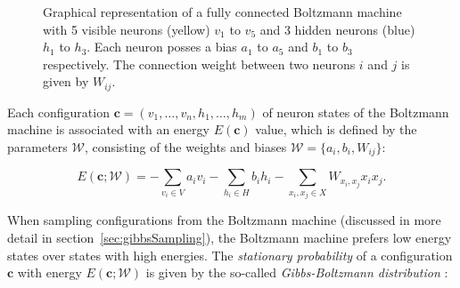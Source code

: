 \begin{figure}[H]
    \centering
    \caption[Fully Connected Boltzmann Machine]{Graphical representation of a fully connected Boltzmann machine with 5 visible neurons (yellow) $v_1$ to $v_5$
    and 3 hidden neurons (blue) $h_1$ to $h_3$. Each neuron posses a bias
    $a_1$ to $a_5$ and $b_1$ to $b_3$ respectively. The connection weight between two neurons $i$ and $j$
    is given by $W_{ij}$.}
    \label{fig:boltzmannMachine}
\end{figure}

Each configuration $\bm{c}=(v_1,\dots,v_n,h_1,\dots,h_m)$ of neuron states
of the Boltzmann machine is associated with an energy $E(\bm{c})$ value,
which is defined by the parameters $\mathcal{W}$, consisting of the weights and 
biases $\mathcal{W} = \{a_i, b_i, W_{ij}\}$:

\begin{equation}
  E(\bm{c};\mathcal{W}) = - \sum_{v_i \in V} a_{i}v_{i} - \sum_{h_i \in H} b_{i}h_{i} - \sum_{x_i,x_j \in X} W_{x_i,x_j}x_{i}x_{j}.
\end{equation}

When sampling configurations from the Boltzmann machine (discussed in more detail in section~\ref{sec:gibbsSampling}), the 
Boltzmann machine prefers low energy states over states with high energies. The \textit{stationary probability}
of a configuration $\bm{c}$ with energy $E(\bm{c};\mathcal{W})$ is given by the so-called \textit{Gibbs-Boltzmann distribution} \cite{gibbs_2010}:

